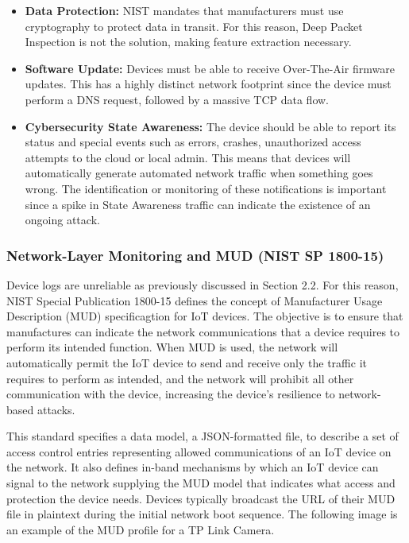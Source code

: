 \begin{itemize}
	\item \textbf{Data Protection:} NIST mandates that manufacturers must use cryptography to protect data in transit. For this reason, Deep Packet Inspection is not the solution, making feature extraction necessary.
	
	\item \textbf{Software Update:} Devices must be able to receive Over-The-Air firmware updates. This has a highly distinct network footprint since the device must perform a DNS request, followed by a massive TCP data flow. 
	
	\item \textbf{Cybersecurity State Awareness:} The device should be able to report its status and special events such as errors, crashes, unauthorized access attempts to the cloud or local admin. This means that devices will automatically generate automated network traffic when something goes wrong. The identification or monitoring of these notifications is important since a spike in State Awareness traffic can indicate the existence of an ongoing attack. 
\end{itemize}


\subsubsection{Network-Layer Monitoring and MUD (NIST SP 1800-15)}
Device logs are unreliable as previously discussed in Section 2.2. For this reason, NIST Special Publication 1800-15 \cite{NISTSP180015} defines the concept of Manufacturer Usage Description (MUD) specificagtion for IoT devices. The objective is to ensure that manufactures can indicate the network communications that a device requires to perform its intended function. When MUD is used, the network will automatically permit the IoT device to send and receive only the traffic it requires to perform as intended, and the network will prohibit all other communication with the device, increasing the device’s resilience to network-based attacks. 

This standard specifies a data model, a JSON-formatted file, to describe a set of access control entries representing allowed communications of an IoT device on the network. It also defines in-band mechanisms by which an IoT device can signal to the network supplying the MUD model that indicates what access and protection the device needs. Devices typically broadcast the URL of their MUD file in plaintext during the initial network boot sequence. The following image is an example of the MUD profile for a TP Link Camera. 


